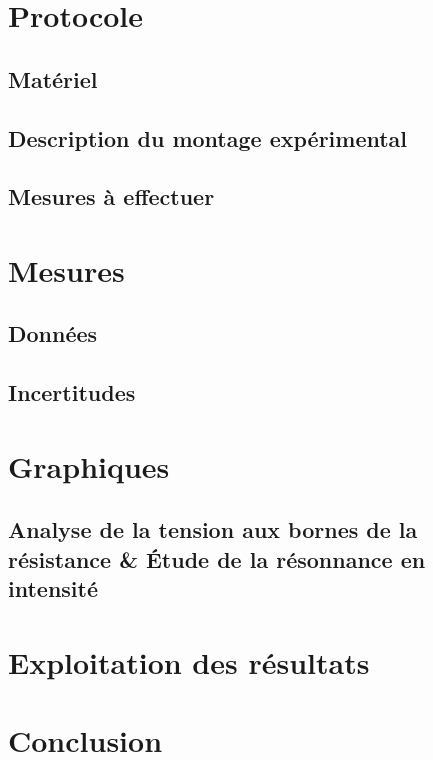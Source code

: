 \documentclass[a4paper,9pt,french]{scrartcl}
\begin{document}
\section{Protocole}
\subsection{Matériel}
\begin{itemize}
\end{itemize}
\subsection{Description du montage expérimental}
\begin{center}
\end{center}
\subsection{Mesures à effectuer}
\section{Mesures}
\subsection{Données}

\subsection{Incertitudes}

\section{Graphiques}
\subsection{Analyse de la tension aux bornes de la résistance \& Étude de la résonnance en intensité}

\section{Exploitation des résultats}
\section{Conclusion}
\end{document}
